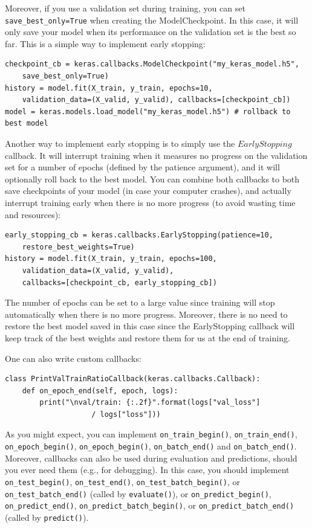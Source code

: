 \documentclass[12pt, letterpaper]{article}
\theoremstyle{definition}
\begin{document}
Moreover, if you use a validation set during training, you can set \lstinline+save_best_only=True+ when creating the ModelCheckpoint. In this case, it will only save your model when its performance on the validation set is the best so far. This is a simple way to implement early stopping:
\begin{lstlisting}
checkpoint_cb = keras.callbacks.ModelCheckpoint("my_keras_model.h5",
    save_best_only=True)
history = model.fit(X_train, y_train, epochs=10,
    validation_data=(X_valid, y_valid), callbacks=[checkpoint_cb])
model = keras.models.load_model("my_keras_model.h5") # rollback to best model
\end{lstlisting}

Another way to implement early stopping is to simply use the $EarlyStopping$ callback. It will interrupt training when it measures no progress on the validation set for a number of epochs (defined by the patience argument), and it will optionally roll back to the best model. You can combine both callbacks to both save checkpoints of your model (in case your computer crashes), and actually interrupt training early when there is no more progress (to avoid wasting time and resources):

\begin{lstlisting}
early_stopping_cb = keras.callbacks.EarlyStopping(patience=10,
    restore_best_weights=True)
history = model.fit(X_train, y_train, epochs=100,
    validation_data=(X_valid, y_valid),
    callbacks=[checkpoint_cb, early_stopping_cb])
\end{lstlisting}
The number of epochs can be set to a large value since training will stop automatically when there is no more progress. Moreover, there is no need to restore the best model saved in this case since the EarlyStopping callback will keep track of the best weights and restore them for us at the end of training.

One can also write custom callbacks:
\begin{lstlisting}
class PrintValTrainRatioCallback(keras.callbacks.Callback): 
    def on_epoch_end(self, epoch, logs):
        print("\nval/train: {:.2f}".format(logs["val_loss"] 
        			/ logs["loss"]))
\end{lstlisting}

As you might expect, you can implement \lstinline+on_train_begin()+, \lstinline+on_train_end()+, \lstinline+on_epoch_begin()+, \lstinline+on_epoch_begin()+, \lstinline+on_batch_end()+ and \lstinline+on_batch_end()+. Moreover, callbacks can also be used during evaluation and predictions, should you ever need them (e.g., for debugging). In this case, you should implement \lstinline+on_test_begin()+, \lstinline+on_test_end()+, \lstinline+on_test_batch_begin()+, or \lstinline+on_test+\lstinline+_batch+\lstinline+_end()+ (called by \lstinline+evaluate()+), or \lstinline+on_predict_begin()+, \lstinline+on_predict_end()+, \lstinline+on_+\lstinline+predict+\lstinline+_batch_begin()+, or \lstinline+on_predict_batch+\lstinline+_end()+ (called by \lstinline+predict()+).
\end{document}
